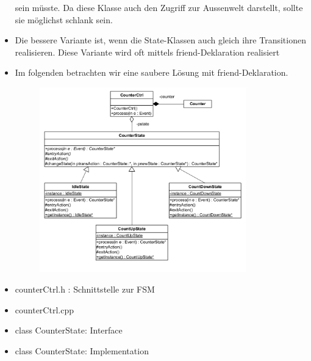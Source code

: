 \begin{itemize}
sein müsste. Da diese Klasse auch den Zugriff zur Aussenwelt darstellt, sollte
sie möglichst schlank sein.
\item Die bessere Variante ist, wenn die State-Klassen auch gleich ihre
Transitionen realisieren. Diese Variante wird oft mittels friend-Deklaration
realisiert
\item Im folgenden betrachten wir eine saubere Lösung mit friend-Deklaration.
 \begin{figure}[h]
  \centering
  \includegraphics[height=8cm]{images/FSM/klassendiagramm}  
\end{figure}
\item counterCtrl.h : Schnittstelle zur FSM


\item counterCtrl.cpp


\item class CounterState: Interface


\item class CounterState: Implementation


\end{itemize}
